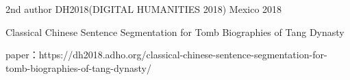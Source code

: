 \begin{cventries}
  \cventry
    {2nd author} %
    {DH2018(DIGITAL HUMANITIES 2018)} %
    {Mexico} %
    {2018} %
    {
      \begin{cvitems} %
      \item { Classical Chinese Sentence Segmentation for Tomb Biographies of Tang Dynasty} %
        \item {paper：https://dh2018.adho.org/classical-chinese-sentence-segmentation-for-tomb-biographies-of-tang-dynasty/}
      \end{cvitems}
    }

\end{cventries}
